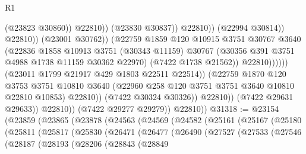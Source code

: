 \begin{lexlean}{R1}
\begin{coremodule}
                                                        (@23823 @30860))
                                                      @22810))
                                                  (@23830 @30837))
                                                @22810))
                                            (@22994 @30814))
                                          @22810))
                                      (@23001 @30762))
                                    (@22759
                                      @1859
                                      @120
                                      @10915
                                      @3751
                                      @30767
                                      @3640
                                      (@22836
                                        @1858
                                        @10913
                                        @3751
                                        (@30343 @11159)
                                        @30767
                                        (@30356 @391 @3751 @4988 @1738 @11159 @30362 @22970)
                                        (@7422 @1738 @21562))
                                      @22810))))))
                          (@23011 @1799 @21917 @429 @1803 @22511 @22514))
                        (@22759
                          @1870
                          @120
                          @3753
                          @3751
                          @10810
                          @3640
                          (@22960 @258 @120 @3751 @3751 @3640 @10810 @22810 @10853)
                          @22810))
                      (@7422 @30324 @30326))
                    @22810))
                (@7422 @29631 @29633))
              @22810))
          (@7422 @29277 @29279))
        @22810))
@31318 := @23154
    (@23859
      (@23865
        (@23878
          (@24563
            (@24569
              (@24582
                (@25161
                  (@25167
                    (@25180
                      (@25811
                        (@25817
                          (@25830
                            (@26471
                              (@26477
                                (@26490
                                  (@27527
                                    (@27533
                                      (@27546
                                        (@28187
                                          (@28193
                                            (@28206
                                              (@28843
                                                (@28849

\end{coremodule}
\end{lexlean}
